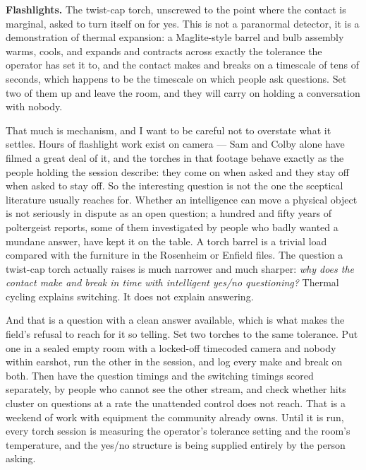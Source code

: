 \textbf{Flashlights.} The twist-cap torch, unscrewed to the point where the contact is marginal,
asked to turn itself on for yes. This is not a paranormal detector, it is a demonstration of
thermal expansion: a Maglite-style barrel and bulb assembly warms, cools, and expands and
contracts across exactly the tolerance the operator has set it to, and the contact makes and
breaks on a timescale of tens of seconds, which happens to be the timescale on which people ask
questions. Set two of them up and leave the room, and they will carry on holding a conversation
with nobody.

That much is mechanism, and I want to be careful not to overstate what it settles. Hours of
flashlight work exist on camera --- Sam and Colby alone have filmed a great deal of it, and the
torches in that footage behave exactly as the people holding the session describe: they come on
when asked and they stay off when asked to stay off. So the interesting question is not the one
the sceptical literature usually reaches for. Whether an intelligence can move a physical object
is not seriously in dispute as an open question; a hundred and fifty years of poltergeist reports,
some of them investigated by people who badly wanted a mundane answer, have kept it on the table.
A torch barrel is a trivial load compared with the furniture in the Rosenheim or Enfield files.
The question a twist-cap torch actually raises is much narrower and much sharper: \emph{why does
the contact make and break in time with intelligent yes/no questioning?} Thermal cycling explains
switching. It does not explain answering.


And that is a question with a clean answer available, which is what makes the field's refusal to
reach for it so telling. Set two torches to the same tolerance. Put one in a sealed empty room
with a locked-off timecoded camera and nobody within earshot, run the other in the session, and
log every make and break on both. Then have the question timings and the switching timings scored
separately, by people who cannot see the other stream, and check whether hits cluster on questions
at a rate the unattended control does not reach. That is a weekend of work with equipment the
community already owns. Until it is run, every torch session is measuring the operator's tolerance
setting and the room's temperature, and the yes/no structure is being supplied entirely by the
person asking. 


